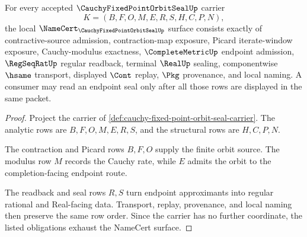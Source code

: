 \begin{theorem}
\label{thm:cauchy-fixed-point-orbit-seal-namecert-obligations}
For every accepted $\CauchyFixedPointOrbitSealUp$ carrier
$$
K=(B,F,O,M,E,R,S,H,C,P,N),
$$
the local $\NameCert_{\CauchyFixedPointOrbitSealUp}$ surface consists exactly of contractive-source admission, contraction-map exposure, Picard iterate-window exposure, Cauchy-modulus exactness, $\CompleteMetricUp$ endpoint admission, $\RegSeqRatUp$ regular readback, terminal $\RealUp$ sealing, componentwise $\hsame$ transport, displayed $\Cont$ replay, $\Pkg$ provenance, and local naming. A consumer may read an endpoint seal only after all those rows are displayed in the same packet.
\end{theorem}
\begin{proof}
Project the carrier of \autoref{def:cauchy-fixed-point-orbit-seal-carrier}. The analytic rows are $B,F,O,M,E,R,S$, and the structural rows are $H,C,P,N$.

The contraction and Picard rows $B,F,O$ supply the finite orbit source. The modulus row $M$ records the Cauchy rate, while $E$ admits the orbit to the completion-facing endpoint route.

The readback and seal rows $R,S$ turn endpoint approximants into regular rational and Real-facing data. Transport, replay, provenance, and local naming then preserve the same row order. Since the carrier has no further coordinate, the listed obligations exhaust the NameCert surface.
\end{proof}

